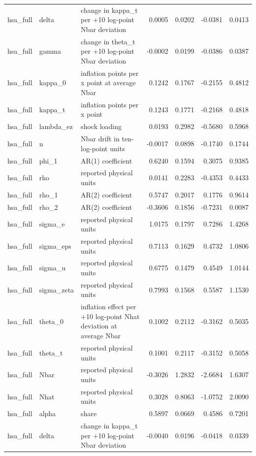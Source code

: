\begin{tabular}{lllrrrr}
hsa\_full & delta & change in kappa\_t per +10 log-point Nbar deviation & 0.0005 & 0.0202 & -0.0381 & 0.0413 \\
hsa\_full & gamma & change in theta\_t per +10 log-point Nbar deviation & -0.0002 & 0.0199 & -0.0386 & 0.0387 \\
hsa\_full & kappa\_0 & inflation points per x point at average Nbar & 0.1242 & 0.1767 & -0.2155 & 0.4812 \\
hsa\_full & kappa\_t & inflation points per x point & 0.1243 & 0.1771 & -0.2168 & 0.4818 \\
hsa\_full & lambda\_ez & shock loading & 0.0193 & 0.2982 & -0.5680 & 0.5968 \\
hsa\_full & n & Nbar drift in ten-log-point units & -0.0017 & 0.0898 & -0.1740 & 0.1744 \\
hsa\_full & phi\_1 & AR(1) coefficient & 0.6240 & 0.1594 & 0.3075 & 0.9385 \\
hsa\_full & rho & reported physical units & 0.0141 & 0.2283 & -0.4353 & 0.4433 \\
hsa\_full & rho\_1 & AR(2) coefficient & 0.5747 & 0.2017 & 0.1776 & 0.9614 \\
hsa\_full & rho\_2 & AR(2) coefficient & -0.3606 & 0.1856 & -0.7231 & 0.0087 \\
hsa\_full & sigma\_e & reported physical units & 1.0175 & 0.1797 & 0.7286 & 1.4268 \\
hsa\_full & sigma\_eps & reported physical units & 0.7113 & 0.1629 & 0.4732 & 1.0806 \\
hsa\_full & sigma\_u & reported physical units & 0.6775 & 0.1479 & 0.4549 & 1.0144 \\
hsa\_full & sigma\_zeta & reported physical units & 0.7993 & 0.1568 & 0.5587 & 1.1530 \\
hsa\_full & theta\_0 & inflation effect per +10 log-point Nhat deviation at average Nbar & 0.1002 & 0.2112 & -0.3162 & 0.5035 \\
hsa\_full & theta\_t & reported physical units & 0.1001 & 0.2117 & -0.3152 & 0.5058 \\
hsa\_full & Nbar & reported physical units & -0.3026 & 1.2832 & -2.6684 & 1.6307 \\
hsa\_full & Nhat & reported physical units & 0.3028 & 0.8063 & -1.0752 & 2.0090 \\
hsa\_full & alpha & share & 0.5897 & 0.0669 & 0.4586 & 0.7201 \\
hsa\_full & delta & change in kappa\_t per +10 log-point Nbar deviation & -0.0040 & 0.0196 & -0.0418 & 0.0339 \\

\end{tabular}
